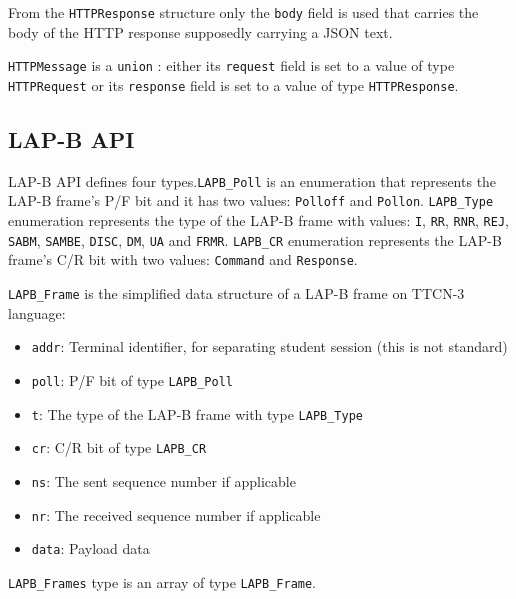 \documentclass[a4paper]{article}
\begin{document}
From the \verb!HTTPResponse! structure only the  \verb!body! field is used that carries the
body of the HTTP response supposedly carrying a JSON text.

\verb!HTTPMessage! is a \verb!union! : either its \verb!request! field is set
to a value of type \verb/HTTPRequest/ or its \verb!response! field is set to a value of type
\verb!HTTPResponse!.

\subsection{LAP-B API}

LAP-B API defines four types.\verb/LAPB_Poll/ is an enumeration that represents the LAP-B frame's P/F bit
and it has two values: \verb/Polloff/ and \verb/Pollon/.
\verb/LAPB_Type/ enumeration represents the type of the LAP-B frame with values:
\verb/I/, \verb/RR/, \verb/RNR/, \verb/REJ/,
\verb/SABM/, \verb/SAMBE/, \verb/DISC/, \verb/DM/,
\verb/UA/ and
\verb/FRMR/.
\verb/LAPB_CR/ enumeration represents the LAP-B frame's C/R bit with two values:
\verb/Command/ and \verb/Response/.

\verb!LAPB_Frame! is the simplified data structure of a LAP-B frame on TTCN-3 language:
\begin{itemize}
    \item \verb/addr/: Terminal identifier, for separating student session (this is not standard)
    \item \verb!poll!:  P/F bit of type \verb/LAPB_Poll/
    \item  \verb!t!: The type of the LAP-B frame with type \verb/LAPB_Type/
    \item \verb!cr!: C/R bit of type \verb/LAPB_CR/
    \item \verb!ns!: The sent sequence number if applicable
    \item \verb!nr!: The received sequence number if applicable
    \item \verb!data!: Payload data
\end{itemize}

\verb!LAPB_Frames! type is an array of type \verb!LAPB_Frame!.
\end{document}
